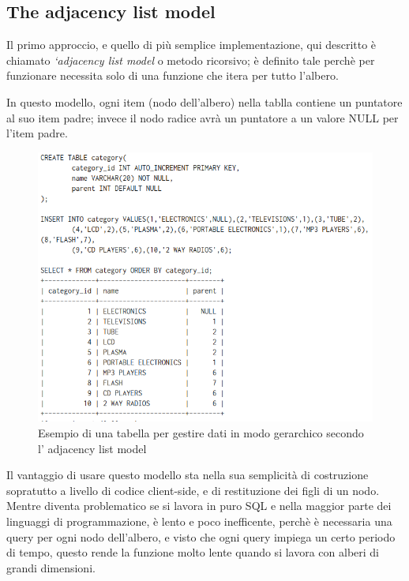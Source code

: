 \subsection{The adjacency list model}
Il primo approccio, e quello di più semplice implementazione, qui descritto è chiamato \textit{‘adjacency list model} o metodo ricorsivo;
è definito tale perchè per funzionare necessita solo di una funzione che itera per tutto l'albero.

In questo modello, ogni item (nodo dell'albero) nella tablla contiene un puntatore al suo item padre; invece il nodo radice avrà un puntatore a un valore
NULL per l'item padre.

\begin{figure}[ht]
    \centering
	\includegraphics[scale=0.8]{images/Adjacency_list_model_table.PNG}
	\caption{Esempio di una tabella per gestire dati in modo gerarchico secondo l' adjacency list model }
\end{figure}
 
Il vantaggio di usare questo modello sta nella sua semplicità di costruzione sopratutto a livello di codice client-side, 
e di restituzione dei figli di un nodo. Mentre diventa problematico se si lavora in puro SQL e nella maggior parte dei linguaggi di 
programmazione, è lento e poco inefficente, perchè è necessaria una query per ogni nodo dell'albero, e visto che ogni query impiega 
un certo periodo di tempo, questo rende la funzione molto lente quando si lavora con alberi di grandi dimensioni.

\newpage

